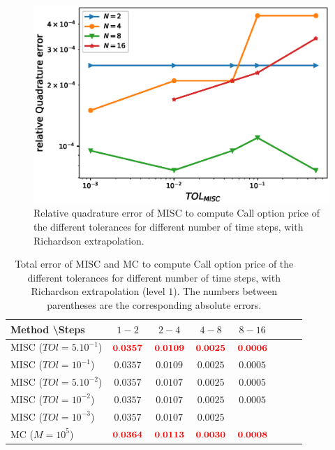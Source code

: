 \documentclass[11pt]{article}
\begin{document}
	\begin{figure}[h!]
\centering
\includegraphics[width=0.7\linewidth]{./figures/Call_MISC_quadrature_error/relative_quad_error_wrt_MISC_TOL_with_rich}


\caption{Relative quadrature error of MISC to compute Call option price of the different tolerances for different number of time steps, with Richardson extrapolation.}
\label{fig:Quadrature_error_with_rich_Call}
\end{figure}





\begin{table}[h!]
	\centering
	\begin{tabular}{l*{6}{c}r}
		Method \textbackslash  Steps            & $1-2$ & $2-4$ & $4-8$ & $8-16$  \\
		\hline
		MISC ($TOl=5.10^{-1}$)  &  $\mathbf{{\color{red}0.0357}}$ & $\mathbf{{\color{red}0.0109}}$ & $\mathbf{{\color{red}0.0025}}$ & $\mathbf{{\color{red}0.0006}}$  \\
		MISC ($TOl=10^{-1}$)  &  $\mathbf{0.0357}$ & $\mathbf{0.0109}$ & $\mathbf{0.0025}$ & $\mathbf{0.0005}$  \\
		MISC ($TOl=5.10^{-2}$) &  $\mathbf{0.0357}$ & $\mathbf{0.0107}$ & $\mathbf{0.0025}$ & $\mathbf{0.0005}$  \\
		MISC ($TOl=10^{-2}$)  &  $\mathbf{0.0357}$ & $\mathbf{0.0107}$ & $\mathbf{0.0025}$ & $\mathbf{0.0005}$ \\
		MISC ($TOl=10^{-3}$) &  $\mathbf{0.0357}$ & $\mathbf{0.0107}$ & $\mathbf{0.0025}$ & $\mathbf{}$  \\
		
		\hline
			MC  ($M=10^5$)   &  $\mathbf{{\color{red}0.0364}}$ & $\mathbf{{\color{red}0.0113}}$ & $\mathbf{{\color{red}0.0030}}$ & $\mathbf{{\color{red}0.0008}}$  \\	
		\hline
	\end{tabular}
	\caption{Total error of MISC and MC to compute Call option price of the different tolerances for different number of time steps, with Richardson extrapolation (level $1$). The numbers between parentheses are the corresponding absolute errors.}
	\label{Total error of MISC and MC to compute Call option price of the different tolerances for different number of time steps, with Richardson extrapolation (level $1$). The numbers between parentheses are the corresponding absolute errors.}
\end{table}
\end{document}
